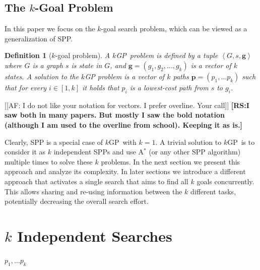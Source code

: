 \documentclass{aicom2e}
\newtheorem{definition}{Definition}
\newcommand{\kgs}{$k$GP}
\newcommand{\astar}{A$^*$}
\newcommand{\kxastar}{k$\times$A$^*$}
\newcommand{\tuple}[1]{\ensuremath{\left \langle #1 \right \rangle }}
\newcommand{\roni}[1]{\textbf{[RS:#1]}}
\begin{document}
\subsection{The $k$-Goal Problem}

In this paper we focus on the $k$-goal search problem, which can be viewed as
a generalization of SPP.



\begin{definition}[$k$-goal problem]
A \kgs\ problem is defined by a tuple $\tuple{G,s, \textbf{g}}$ where $G$ is a
graph $s$ is state in $G$, and $\textbf{g}=(g_1,g_2,\ldots,g_k)$ is a vector of
$k$ states. A solution to the \kgs{} problem is a vector of $k$ paths
$\textbf{p}=(p_1,\ldots p_k)$ such that for every  $i\in [1,k]$ it holds that
$p_i$ is a lowest-cost path from $s$ to $g_i$. \label{def:k-goal}
\end{definition}



[[AF: I do not like your notation for vectors. I prefer overline. Your call]]
\roni{I saw both in many papers. But mostly I saw the bold notation (although I am used to the overline from school). Keeping it as is.}

Clearly, SPP is a special case of \kgs\ with $k=1$. A trivial solution to \kgs\
is to consider it as $k$ independent SPPs and use \astar{} (or any other SPP
algorithm) multiple times to solve these $k$ problems. In the next section we
present this approach and analyze its complexity. In later sections we
introduce a different approach that activates a single search that aims to find
all $k$ goals concurrently. This allows sharing and re-using information
between the $k$ different tasks, potentially decreasing the overall search
effort.


\section{$k$ Independent Searches}
\label{sec:k-one-goal}
\begin{algorithm2e}[t!]
    \small
    \For{$i$=1 to $k$}{
        $p_i\gets$ \astar{}($s$,$g_i$)\\
    }
    \Return $p_1,\ldots p_k$\\
    \caption{\kxastar{}: \kgs{} with $k$ \astar{}s}
    \label{alg:k-searches}
\end{algorithm2e}
\end{document}
